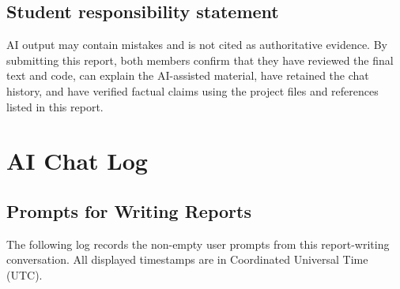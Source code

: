 \documentclass[11pt,a4paper]{report}
\begin{document}
\section{Student responsibility statement}
AI output may contain mistakes and is not cited as authoritative evidence. By
submitting this report, both members confirm that they have reviewed the final
text and code, can explain the AI-assisted material, have retained the chat
history, and have verified factual claims using the project files and references
listed in this report.

\chapter{AI Chat Log}
\section{Prompts for Writing Reports}
The following log records the non-empty user prompts from this report-writing
conversation. All displayed timestamps are in Coordinated Universal Time (UTC).
\end{document}
